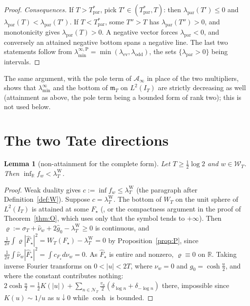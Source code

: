 \documentclass[11pt]{amsart}
\newtheorem{lemma}[theorem]{Lemma}
\theoremstyle{definition}
\theoremstyle{remark}
\newcommand{\R}{\mathbb R}
\newcommand{\IT}{I_T}
\newcommand{\lamW}{\lambda^{\mathrm W}_T}
\newcommand{\sT}{\sigma_T}
\newcommand{\gh}[1]{\widehat g_{#1}}
\newcommand{\nuh}{\widehat\nu}
\newcommand{\Fh}{\widehat F}
\newcommand{\Wcl}{\mathcal W_T}
\newcommand{\NT}{\mathcal N_T}
\newcommand{\Ainf}{\mathcal A_\infty}
\newcommand{\mT}{\mathfrak m_T}
\newcommand{\laminf}{\lambda^{\infty}_{\min}}
\newcommand{\laminfP}{\lambda^{\infty,\mathrm P}_{\min}}
\begin{document}
\begin{proof}
\emph{Consequences.} If $T>T^*_{\mathrm{par}}$, pick $T'\in(T^*_{\mathrm{par}},T)$: then
$\lambda_{\mathrm{par}}(T')\le0$ and $\lambda_{\mathrm{par}}(T)<\lambda_{\mathrm{par}}(T')$. If
$T<T^*_{\mathrm{par}}$, some $T''>T$ has $\lambda_{\mathrm{par}}(T'')>0$, and monotonicity gives
$\lambda_{\mathrm{par}}(T)>0$. A negative vector forces $\lambda_{\mathrm{par}}<0$, and conversely an
attained negative bottom spans a negative line. The last two statements follow from
$\laminfP=\min(\lambda_{\mathrm{ev}},\lambda_{\mathrm{odd}})$, the sets $\{\lambda_{\mathrm{par}}>0\}$ being
intervals.
\end{proof}
The same argument, with the pole term of $\Ainf$ in place of the two multipliers, shows that $\laminf$
and the bottom of $\mT$ on $L^2(\IT)$ are strictly decreasing as well (attainment as above, the pole
term being a bounded form of rank two); this is not used below.

\section{The two Tate directions}\label{sec:complete}

\begin{lemma}[non-attainment for the complete form]\label{lem:Onat}
Let $T\ge\frac12\log2$ and $w\in\Wcl$. Then $\inf_\R f_w<\lamW$.
\end{lemma}
\begin{proof}
Weak duality gives $c:=\inf f_w\le\lamW$ (the paragraph after Definition~\ref{def:W}). Suppose $c=\lamW$. The
bottom of $W_T$ on the unit sphere of $L^2(\IT)$ is attained at some $F_\star$ (\cite[Thm.~3]{Bombieri2000},
or the compactness argument in the proof of Theorem~\ref{thm:O}, which uses only that the symbol tends to
$+\infty$). Then $\varrho:=\sT+\nuh_w+2\gh0-\lamW\ge0$ is continuous, and
$\frac1{2\pi}\int\varrho|\Fh_\star|^2=W_T(F_\star)-\lamW=0$ by Proposition~\ref{prop:P}, since
$\frac1{2\pi}\int\nuh_w|\Fh_\star|^2=\int c_{F_\star}d\nu_w=0$. As $\Fh_\star$ is entire and nonzero,
$\varrho\equiv0$ on $\R$. Taking inverse Fourier transforms on $0<|u|<2T$, where $\nu_w=0$ and $g_0=\cosh\frac u2$,
and where the constant contributes nothing: $2\cosh\frac u2=\frac12K(|u|)+\sum_{n\in\NT}\frac{v_n}2(\delta_{\log n}+\delta_{-\log n})$
there, impossible since $K(u)\sim1/u$ as $u\downarrow0$ while $\cosh$ is bounded.
\end{proof}
\end{document}
